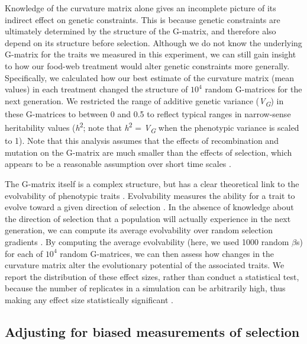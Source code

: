 \documentclass[11pt,]{article}
\begin{document}
Knowledge of the curvature matrix alone gives an incomplete picture of
its indirect effect on genetic constraints. This is because genetic
constraints are ultimately determined by the structure of the G-matrix,
and therefore also depend on its structure before selection. Although we
do not know the underlying G-matrix for the traits we measured in this
experiment, we can still gain insight to how our food-web treatment
would alter genetic constraints more generally. Specifically, we
calculated how our best estimate of the curvature matrix (mean values)
in each treatment changed the structure of \ensuremath{10^{4}} random
G-matrices for the next generation. We restricted the range of additive
genetic variance (\emph{V\textsubscript{G}}) in these G-matrices to
between 0 and 0.5 to reflect typical ranges in narrow-sense heritability
values (\emph{h}\textsuperscript{2}; note that
\emph{h}\textsuperscript{2} = \emph{V\textsubscript{G}} when the
phenotypic variance is scaled to 1). Note that this analysis assumes
that the effects of recombination and mutation on the G-matrix are much
smaller than the effects of selection, which appears to be a reasonable
assumption over short time scales \citep{Arnold2008}.

The G-matrix itself is a complex structure, but has a clear theoretical
link to the evolvability of phenotypic traits \citep{Hansen2008}.
Evolvability measures the ability for a trait to evolve toward a given
direction of selection \citep{Hansen2008}. In the absence of knowledge
about the direction of selection that a population will actually
experience in the next generation, we can compute its average
evolvability over random selection gradients
\citep{Hansen2008, Melo2015}. By computing the average evolvability
(here, we used 1000 random \(\beta\)s) for each of \ensuremath{10^{4}}
random G-matrices, we can then assess how changes in the curvature
matrix alter the evolutionary potential of the associated traits. We
report the distribution of these effect sizes, rather than conduct a
statistical test, because the number of replicates in a simulation can
be arbitrarily high, thus making any effect size statistically
significant \citep{White2014}.

\subsection{Adjusting for biased measurements of
selection}\label{adjusting-for-biased-measurements-of-selection}
\end{document}
